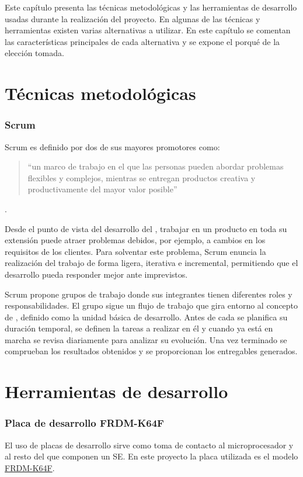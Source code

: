 Este capítulo presenta las técnicas metodológicas y las herramientas de
desarrollo usadas durante la realización del proyecto. En algunas de las
técnicas y herramientas existen varias alternativas a utilizar. En este capítulo
se comentan las características principales de cada alternativa y se expone el
porqué de la elección tomada.

\section{Técnicas metodológicas}{\label{sec:tecnicas}}

\subsubsection{Scrum}{\label{sec:scrum}}
Scrum es definido por dos de sus mayores promotores \textcite{schwaber2017}
como:
\begin{quotation}``un marco de trabajo en el que las personas pueden
  abordar problemas flexibles y complejos, mientras se entregan productos creativa y
  productivamente del mayor valor posible''
\end{quotation}.

Desde el punto de vista del desarrollo del , trabajar en
un producto en toda su extensión puede atraer problemas debidos, por ejemplo, a
cambios en los requisitos de los clientes. Para solventar este problema, Scrum
enuncia la realización del trabajo de forma ligera, iterativa e incremental,
permitiendo que el desarrollo pueda responder mejor ante imprevistos.

Scrum propone grupos de trabajo donde sus integrantes tienen diferentes roles y
responsabilidades. El grupo sigue un flujo de trabajo que gira entorno al
concepto de , definido como la unidad básica de
desarrollo. Antes de cada  se planifica su duración
temporal, se definen la tareas a realizar en él y cuando ya está en marcha se
revisa diariamente para analizar su evolución. Una vez terminado se comprueban
los resultados obtenidos y se proporcionan los entregables generados.

\section{Herramientas  de desarrollo}
  {\label{sec:herramientas}}

\subsubsection{Placa de desarrollo FRDM-K64F}{\label{sec:k64f}}
El uso de placas de desarrollo sirve como toma de contacto al microprocesador y
al resto del  que componen un SE. En este proyecto la
placa utilizada es el modelo
\href{https://www.nxp.com/support/developer-resources/evaluation-and-development-boards/freedom-development-boards/mcu-boards/freedom-development-platform-for-kinetis-k64-k63-and-k24-mcus:FRDM-K64F}
{FRDM-K64F}.

